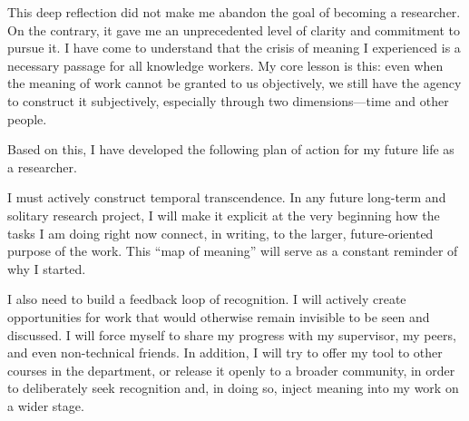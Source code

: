 \documentclass[12pt,a4paper]{article}
\begin{document}
This deep reflection did not make me abandon the goal of becoming a researcher. On the contrary, it gave me an unprecedented level of clarity and commitment to pursue it. I have come to understand that the crisis of meaning I experienced is a necessary passage for all knowledge workers. My core lesson is this: even when the meaning of work cannot be granted to us objectively, we still have the agency to construct it subjectively, especially through two dimensions---time and other people.

Based on this, I have developed the following plan of action for my future life as a researcher.

I must actively construct temporal transcendence. In any future long-term and solitary research project, I will make it explicit at the very beginning how the tasks I am doing right now connect, in writing, to the larger, future-oriented purpose of the work. This ``map of meaning'' will serve as a constant reminder of why I started.

I also need to build a feedback loop of recognition. I will actively create opportunities for work that would otherwise remain invisible to be seen and discussed. I will force myself to share my progress with my supervisor, my peers, and even non-technical friends. In addition, I will try to offer my tool to other courses in the department, or release it openly to a broader community, in order to deliberately seek recognition and, in doing so, inject meaning into my work on a wider stage.



\end{document}

